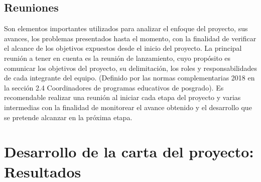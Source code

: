 \documentclass[letterpaper,12pt,openright,oneside]{article}
\theoremstyle{plain}
\begin{document}
% 
% 
\subsection*{Reuniones}

Son elementos importantes utilizados para analizar el enfoque del proyecto, sus avances, los problemas presentados hasta el momento, con la finalidad de verificar el alcance de los objetivos expuestos desde el inicio del proyecto.
La principal reunión a tener en cuenta es la reunión de lanzamiento, cuyo propósito es comunicar los objetivos del proyecto, su delimitación, los roles y responsabilidades de cada integrante del equipo.
(Definido por las normas complementarias 2018 en la sección 2.4 Coordinadores de programas educativos de posgrado).
Es recomendable realizar una reunión al iniciar cada etapa del proyecto y varias intermedias con la finalidad de monitorear el avance obtenido y el desarrollo que se pretende alcanzar en la próxima etapa.

% 
%
\section*{Desarrollo de la carta del proyecto: Resultados}

% 
%
\end{document}

